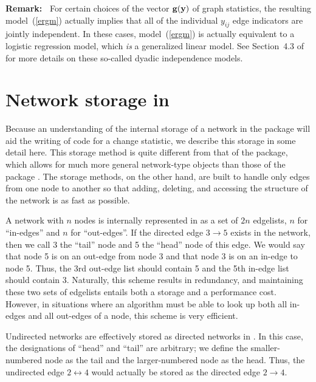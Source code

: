 \documentclass[nojss]{jss}
\def\vec#1{\mathchoice{\mbox{\boldmath$\displaystyle\bf#1$}}
{\mbox{\boldmath$\textstyle\bf#1$}}
{\mbox{\boldmath$\scriptstyle\bf#1$}}
{\mbox{\boldmath$\scriptscriptstyle\bf#1$}}}
\begin{document}
{\bf Remark:\ }
For certain choices of the vector $\vec g(\vec y)$ of graph statistics, the resulting
model~(\ref{ergm}) actually implies that all of the individual $y_{ij}$ edge indicators
are jointly independent.  In these cases, model~(\ref{ergm}) is actually equivalent
to a logistic regression model, which {\em is} a generalized linear model.
See Section~4.3 of \cite{ergmjss} for more details on these so-called
dyadic independence models.

\section[Network storage in ergm]{Network storage in }
\label{networkstorage}

Because an understanding of the internal storage of a network in the  package will aid
the writing of code for a change statistic, we describe this storage in some detail here.
This storage method is quite different from that of the  package,
which allows for much more general network-type objects
than those of the  package \citep{networkjss}.
The  storage methods, on the other hand, are built to
handle only edges from one node to another
so that adding, deleting, and accessing the structure of the network is as
fast as possible.

A network
with $n$ nodes is internally represented in  as a set of $2n$ edgelists,
$n$ for ``in-edges'' and $n$ for ``out-edges''.  If the directed edge
$3\!\!\longrightarrow\!\!5$ exists in the network,
then we call 3 the ``tail'' node and 5 the ``head'' node of this edge.  We would say that node 5 is
on an out-edge from node 3 and that node 3 is on an in-edge to node 5.  Thus, the 3rd out-edge list
should contain 5 and the 5th in-edge list should contain 3.  Naturally, this scheme results in
redundancy, and maintaining these two sets of edgelists entails both a storage and a performance
cost.  However, in situations where an algorithm must be able to look up both all in-edges and all
out-edges of a node, this scheme is very efficient.


Undirected networks are effectively stored as directed networks in .  In this case, the
designations of ``head'' and ``tail'' are arbitrary; we define the smaller-numbered node as the tail
and the larger-numbered node as the head. Thus, the undirected edge
$2\!\!\longleftrightarrow\!\!4$ would actually be stored as the directed edge
$2\!\!\longrightarrow\!\!4$.
\end{document}
